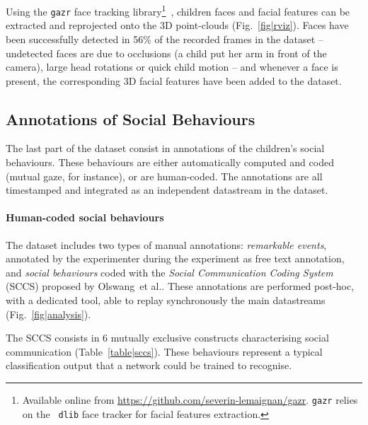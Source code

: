 \documentclass{article}
\newcommand{\etal}{et al.\xspace}
\begin{document}
Using the {\tt gazr} face tracking library\footnote{Available online from
\url{https://github.com/severin-lemaignan/gazr}. {\tt gazr} relies on the {\tt
dlib} face tracker for facial features
extraction.}~\cite{lemaignan2016realtime}, children faces and facial features
can be extracted and reprojected onto the 3D point-clouds
(Fig.~\ref{fig|rviz}). Faces have been successfully detected in 56\% of the
recorded frames in the dataset -- undetected faces are due to occlusions (a child
put her arm in front of the camera), large head rotations or quick child
motion -- and whenever a face is present, the corresponding 3D facial features
have been added to the dataset.

\subsection{Annotations of Social Behaviours}

The last part of the dataset consist in annotations of the children's social
behaviours. These behaviours are either automatically computed and coded
(mutual gaze, for instance), or are human-coded. The annotations are all
timestamped and integrated as an independent datastream in the dataset.

\paragraph{Human-coded social behaviours}

The dataset includes two types of manual annotations: \emph{remarkable events},
annotated by the experimenter during the experiment as free text annotation, and
\emph{social behaviours} coded with the \emph{Social Communication Coding
System} (SCCS) proposed by Olswang~\etal\cite{olswang2006reliability}.
These annotations are performed post-hoc, with a dedicated tool, able to replay synchronously
the main datastreams (Fig.~\ref{fig|analysis}).

The SCCS consists in 6 mutually exclusive constructs characterising social
communication (Table~\ref{table|sccs}). These behaviours represent a typical
classification output that a network could be trained to recognise.
\end{document}
